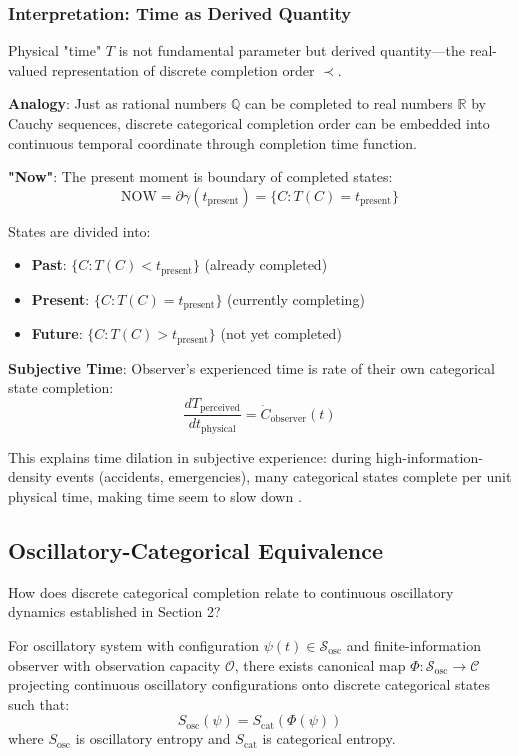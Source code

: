 \documentclass[11pt,onecolumn]{article}
\begin{document}
\subsubsection{Interpretation: Time as Derived Quantity}

Physical "time" $T$ is not fundamental parameter but derived quantity---the real-valued representation of discrete completion order $\prec$. 

\textbf{Analogy}: Just as rational numbers $\mathbb{Q}$ can be completed to real numbers $\mathbb{R}$ by Cauchy sequences, discrete categorical completion order can be embedded into continuous temporal coordinate through completion time function.

\textbf{"Now"}: The present moment is boundary of completed states:
\begin{equation}
\text{NOW} = \partial \gamma(t_{\text{present}}) = \{C : T(C) = t_{\text{present}}\}
\end{equation}

States are divided into:
\begin{itemize}
\item \textbf{Past}: $\{C : T(C) < t_{\text{present}}\}$ (already completed)
\item \textbf{Present}: $\{C : T(C) = t_{\text{present}}\}$ (currently completing)
\item \textbf{Future}: $\{C : T(C) > t_{\text{present}}\}$ (not yet completed)
\end{itemize}

\textbf{Subjective Time}: Observer's experienced time is rate of their own categorical state completion:
\begin{equation}
\frac{dT_{\text{perceived}}}{dt_{\text{physical}}} = \dot{C}_{\text{observer}}(t)
\end{equation}

This explains time dilation in subjective experience: during high-information-density events (accidents, emergencies), many categorical states complete per unit physical time, making time seem to slow down \citep{stetson2006time}.

\subsection{Oscillatory-Categorical Equivalence}

How does discrete categorical completion relate to continuous oscillatory dynamics established in Section 2?

\begin{theorem}
\label{thm:osc_cat_equiv}
For oscillatory system with configuration $\psi(t) \in \mathcal{S}_{\text{osc}}$ and finite-information observer with observation capacity $\mathcal{O}$, there exists canonical map $\Phi: \mathcal{S}_{\text{osc}} \to \mathcal{C}$ projecting continuous oscillatory configurations onto discrete categorical states such that:
\begin{equation}
S_{\text{osc}}(\psi) = S_{\text{cat}}(\Phi(\psi))
\end{equation}
where $S_{\text{osc}}$ is oscillatory entropy and $S_{\text{cat}}$ is categorical entropy.
\end{theorem}
\end{document}

